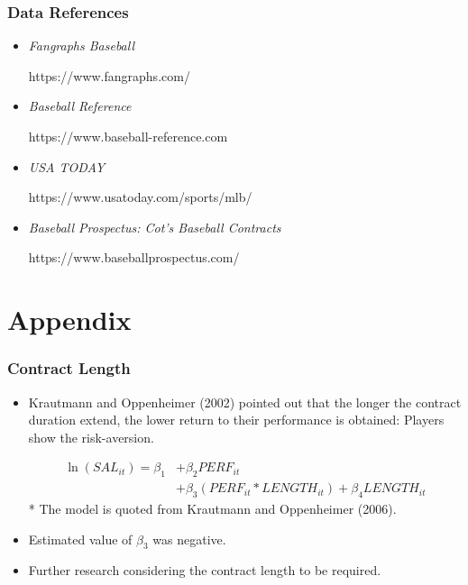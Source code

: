 \documentclass[dvipdfmx,12pt]{beamer}
\begin{document}
\begin{frame}\frametitle{Data References}
  \begin{itemize}
    \item \textit{Fangraphs Baseball}

    https://www.fangraphs.com/

    \item \textit{Baseball Reference}

    https://www.baseball-reference.com

    \item \textit{USA TODAY}

    https://www.usatoday.com/sports/mlb/

    \item \textit{Baseball Prospectus: Cot's Baseball Contracts}

    https://www.baseballprospectus.com/
  \end{itemize}
\end{frame}

\section*{Appendix}
\begin{frame}\frametitle{Contract Length}
  \begin{itemize}
    \item Krautmann and Oppenheimer (2002) pointed out that the longer the contract duration extend, the lower return to their performance is obtained: Players show the risk-aversion.

    \begin{align*}
      \ln(SAL_{it}) = \beta_1 &+ \beta_2 PERF_{it} \\
      &+ \beta_3 (PERF_{it} * LENGTH_{it})+ \beta_4 LENGTH_{it}
    \end{align*}
    \footnotesize
    \flushright
    * The model is quoted from Krautmann and Oppenheimer (2006).

    \flushleft
    \normalsize

    \item Estimated value of $\beta_3$ was negative.

    \item Further research considering the contract length to be required.
  \end{itemize}

\end{frame}
\end{document}

